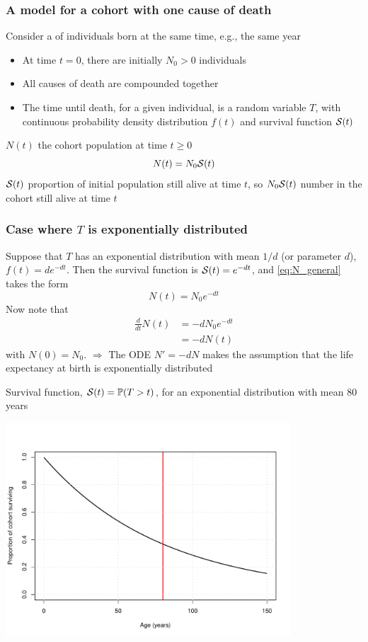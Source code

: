 \documentclass[aspectratio=169]{beamer}\usepackage[]{graphicx}\usepackage[]{xcolor}
\begin{document}
\begin{frame}\frametitle{A model for a cohort with one cause of death}
Consider a  of individuals born at the same time, e.g., the same year
\vfill
\begin{itemize}
\item At time $t=0$, there are initially $N_0>0$ individuals
\item All causes of death are compounded together 
\item The time until death, for a given individual, is a random variable $T$, with continuous probability density distribution $f(t)$ and survival function $\S(t)$
\end{itemize}
\vfill
$N(t)$ the cohort population at time $t\geq 0$
\begin{equation}\label{eq:N_general}
N(t)=N_0\S(t)
\end{equation}
\vfill
$\S(t)$ proportion of initial population still alive at time $t$, so $N_0\S(t)$ number in the cohort still alive at time $t$
\end{frame}

\begin{frame}\frametitle{Case where $T$ is exponentially distributed}
Suppose that $T$ has an exponential distribution with mean $1/d$ (or parameter $d$), $f(t)=de^{-dt}$. Then the survival function is $\S(t)=e^{-dt}$, and \eqref{eq:N_general} takes the form
\begin{equation}\label{eq:N}
N(t)=N_0e^{-dt}
\end{equation}
\vfill
Now note that
\begin{align*}
\frac{d}{dt} N(t) &= -dN_0e^{-dt} \\
&= -dN(t)
\end{align*}
with $N(0)=N_0$.
\vfill
{\red $\Rightarrow$} The ODE $N'=-dN$ makes the assumption that the life expectancy at birth is exponentially distributed
\end{frame}



\begin{frame}
Survival function, $\S(t)=\IP(T>t)$, for an exponential distribution with mean 80 years
\begin{center}
\includegraphics[width=0.8\textwidth]{FIGS/L23-prop_surviving_exp_80years-1.pdf}
\end{center}
\end{frame}
\end{document}
